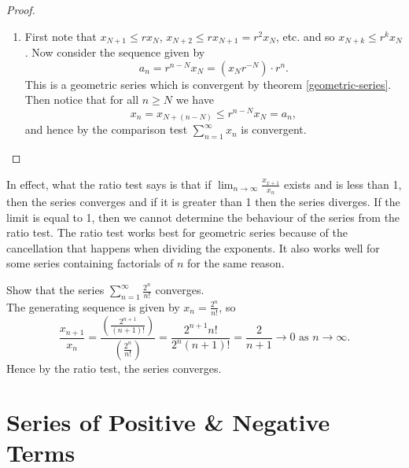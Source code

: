 \documentclass[../real_analysis.tex]{subfiles}
\begin{document}
        \begin{proof}\\
            \begin{enumerate}[\upshape(i)]
                \item First note that $x_{N+1}\leq rx_N$, $x_{N+2}\leq rx_{N+1}=r^2x_N$, etc. and so $x_{N+k}\leq r^kx_N$. Now consider the sequence given by
                \begin{equation*}
                    a_n=r^{n-N}x_N=(x_Nr^{-N})\cdot r^n.
                \end{equation*}
                This is a geometric series which is convergent by theorem \ref{geometric-series}. Then notice that for all $n\geq N$ we have
                \begin{equation*}
                    x_n=x_{N+(n-N)}\leq r^{n-N}x_N=a_n,
                \end{equation*}
                and hence by the comparison test $\sum_{n=1}^\infty x_n$ is convergent.
            \end{enumerate}
        \end{proof}
        In effect, what the ratio test says is that if $\lim_{n\to\infty}\frac{x_{x+1}}{x_n}$ exists and is less than 1, then the series converges and if it is greater than 1 then the series diverges. If the limit is equal to 1, then we cannot determine the behaviour of the series from the ratio test. The ratio test works best for geometric series because of the cancellation that happens when dividing the exponents. It also works well for some series containing factorials of $n$ for the same reason.
        \begin{example}
            Show that the series $\sum_{n=1}^\infty\frac{2^n}{n!}$ converges.\\
            The generating sequence is given by $x_n=\frac{2^n}{n!}$, so
            \begin{equation*}
                \frac{x_{n+1}}{x_n}=\frac{\left(\frac{2^{n+1}}{(n+1)!}\right)}{\left(\frac{2^n}{n!}\right)}=\frac{2^{n+1}n!}{2^n(n+1)!}=\frac{2}{n+1}\to0\text{ as }n\to\infty.
            \end{equation*}
            Hence by the ratio test, the series converges.
        \end{example}

    \section{Series of Positive \& Negative Terms}
\end{document}
